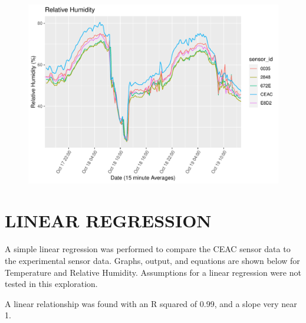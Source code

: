 \documentclass[
  letterpaper,
  DIV=11,
  numbers=noendperiod]{scrartcl}
\begin{document}
\begin{figure}[H]

{\centering \includegraphics{THP_CEAC_20231102_files/figure-pdf/data_plot_all_rh-1.pdf}

}

\end{figure}

\hypertarget{linear-regression}{%
\section{LINEAR REGRESSION}\label{linear-regression}}

A simple linear regression was performed to compare the CEAC sensor data
to the experimental sensor data. Graphs, output, and equations are shown
below for Temperature and Relative Humidity. Assumptions for a linear
regression were not tested in this exploration.

A linear relationship was found with an R squared of 0.99, and a slope
very near 1.
\end{document}
